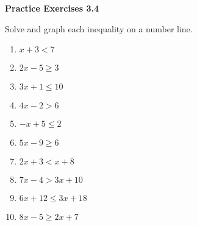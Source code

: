  \vspace{1ex}
\noindent\textbf{Practice Exercises 3.4}

\vspace{0.75ex}

Solve and graph each inequality on a number line.
\begin{multicols}{2}
\begin{enumerate}[noitemsep, label = \color{blue}\arabic*. ]    \item $x + 3 < 7$
    \item $2x - 5 \geq 3$
    \item $3x + 1 \leq 10$
    \item $4x - 2 > 6$
    \item $-x + 5 \leq 2$
    \item $5x - 9 \geq 6$
    \item $2x + 3 < x + 8$
    \item $7x - 4 > 3x + 10$
    \item $6x + 12 \leq 3x + 18$
    \item $8x - 5 \geq 2x + 7$
\end{enumerate}
\end{multicols}

